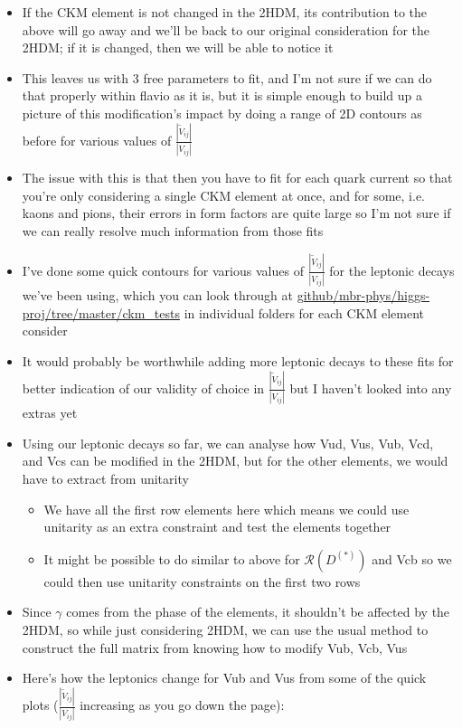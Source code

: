 \documentclass[11pt]{article}
\newcommand{\tVV}{\frac{|\tilde{V}_{ij}|}{|V_{ij}|}}
\begin{document}
\begin{itemize}
    \item If the CKM element is not changed in the 2HDM, its contribution to the above will go away and we'll be back to our original consideration for the 2HDM; if it is changed, then we will be able to notice it
    \item This leaves us with 3 free parameters to fit, and I'm not sure if we can do that properly within flavio as it is, but it is simple enough to build up a picture of this modification's impact by doing a range of 2D contours as before for various values of $\tVV$
    \item The issue with this is that then you have to fit for each quark current so that you're only considering a single CKM element at once, and for some, i.e. kaons and pions, their errors in form factors are quite large so I'm not sure if we can really resolve much information from those fits
    \item I've done some quick contours for various values of $\tVV$ for the leptonic decays we've been using, which you can look through at \href{https://github.com/mbr-phys/higgs-proj/tree/master/ckm_tests}{github/mbr-phys/higgs-proj/tree/master/ckm\_tests} in individual folders for each CKM element consider
    \item It would probably be worthwhile adding more leptonic decays to these fits for better indication of our validity of choice in $\tVV$ but I haven't looked into any extras yet
    \item Using our leptonic decays so far, we can analyse how Vud, Vus, Vub, Vcd, and Vcs can be modified in the 2HDM, but for the other elements, we would have to extract from unitarity 
        \begin{itemize}
            \item We have all the first row elements here which means we could use unitarity as an extra constraint and test the elements together
            \item It might be possible to do similar to above for $\mathcal{R}(D^{(*)})$ and Vcb so we could then use unitarity constraints on the first two rows
        \end{itemize}
    \item Since $\gamma$ comes from the phase of the elements, it shouldn't be affected by the 2HDM, so while just considering 2HDM, we can use the usual method to construct the full matrix from knowing how to modify Vub, Vcb, Vus
    \item Here's how the leptonics change for Vub and Vus from some of the quick plots ($\tVV$ increasing as you go down the page):
\end{itemize}
\end{document}
